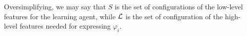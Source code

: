 %	
%	

Oversimplifying, we may say that $S$ is the set of configurations of
the low-level features for the learning agent, while $\mathcal{L}$ is
the set of configuration of the high-level features needed for
expressing $\varphi_i$.

